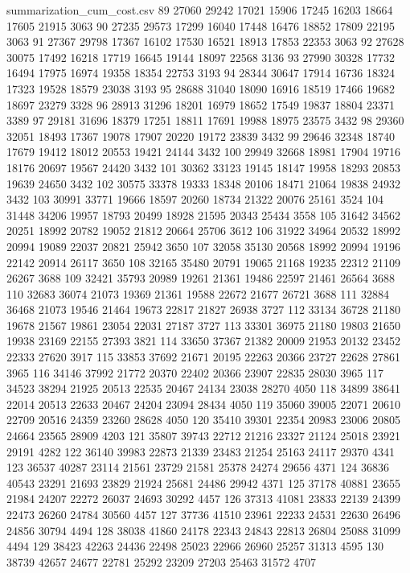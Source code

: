 \begin{filecontents*}{summarization_cum_cost.csv}
89	27060	29242	17021	15906	17245	16203	18664	17605	21915	3063
90	27235	29573	17299	16040	17448	16476	18852	17809	22195	3063
91	27367	29798	17367	16102	17530	16521	18913	17853	22353	3063
92	27628	30075	17492	16218	17719	16645	19144	18097	22568	3136
93	27990	30328	17732	16494	17975	16974	19358	18354	22753	3193
94	28344	30647	17914	16736	18324	17323	19528	18579	23038	3193
95	28688	31040	18090	16916	18519	17466	19682	18697	23279	3328
96	28913	31296	18201	16979	18652	17549	19837	18804	23371	3389
97	29181	31696	18379	17251	18811	17691	19988	18975	23575	3432
98	29360	32051	18493	17367	19078	17907	20220	19172	23839	3432
99	29646	32348	18740	17679	19412	18012	20553	19421	24144	3432
100	29949	32668	18981	17904	19716	18176	20697	19567	24420	3432
101	30362	33123	19145	18147	19958	18293	20853	19639	24650	3432
102	30575	33378	19333	18348	20106	18471	21064	19838	24932	3432
103	30991	33771	19666	18597	20260	18734	21322	20076	25161	3524
104	31448	34206	19957	18793	20499	18928	21595	20343	25434	3558
105	31642	34562	20251	18992	20782	19052	21812	20664	25706	3612
106	31922	34964	20532	18992	20994	19089	22037	20821	25942	3650
107	32058	35130	20568	18992	20994	19196	22142	20914	26117	3650
108	32165	35480	20791	19065	21168	19235	22312	21109	26267	3688
109	32421	35793	20989	19261	21361	19486	22597	21461	26564	3688
110	32683	36074	21073	19369	21361	19588	22672	21677	26721	3688
111	32884	36468	21073	19546	21464	19673	22817	21827	26938	3727
112	33134	36728	21180	19678	21567	19861	23054	22031	27187	3727
113	33301	36975	21180	19803	21650	19938	23169	22155	27393	3821
114	33650	37367	21382	20009	21953	20132	23452	22333	27620	3917
115	33853	37692	21671	20195	22263	20366	23727	22628	27861	3965
116	34146	37992	21772	20370	22402	20366	23907	22835	28030	3965
117	34523	38294	21925	20513	22535	20467	24134	23038	28270	4050
118	34899	38641	22014	20513	22633	20467	24204	23094	28434	4050
119	35060	39005	22071	20610	22709	20516	24359	23260	28628	4050
120	35410	39301	22354	20983	23006	20805	24664	23565	28909	4203
121	35807	39743	22712	21216	23327	21124	25018	23921	29191	4282
122	36140	39983	22873	21339	23483	21254	25163	24117	29370	4341
123	36537	40287	23114	21561	23729	21581	25378	24274	29656	4371
124	36836	40543	23291	21693	23829	21924	25681	24486	29942	4371
125	37178	40881	23655	21984	24207	22272	26037	24693	30292	4457
126	37313	41081	23833	22139	24399	22473	26260	24784	30560	4457
127	37736	41510	23961	22233	24531	22630	26496	24856	30794	4494
128	38038	41860	24178	22343	24843	22813	26804	25088	31099	4494
129	38423	42263	24436	22498	25023	22966	26960	25257	31313	4595
130	38739	42657	24677	22781	25292	23209	27203	25463	31572	4707

\end{filecontents*}
